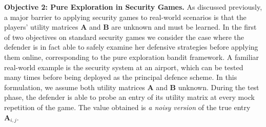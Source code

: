  
\textbf{Objective 2: Pure Exploration in Security Games.}
As discussed previously, a major barrier to applying security games to real-world scenarios is that the players' utility matrices $\boldsymbol A$ and $\boldsymbol B$ are unknown and must be learned. In the first of two objectives on standard security games we consider the case where the defender is in fact able to safely examine her defensive strategies before applying them online, corresponding to the pure exploration bandit framework. A familiar real-world example is the security system at an airport, which can be tested many times before being deployed as the principal defence scheme.  
%
In this formulation, we assume both utility matrices $\boldsymbol A$ and $\boldsymbol B$ unknown. During the test phase, the defender is able to probe an entry of its utility matrix at every mock repetition of the game. The value obtained is {\em a noisy version} of the true entry $\boldsymbol A_{i,j}$. 
%
 

